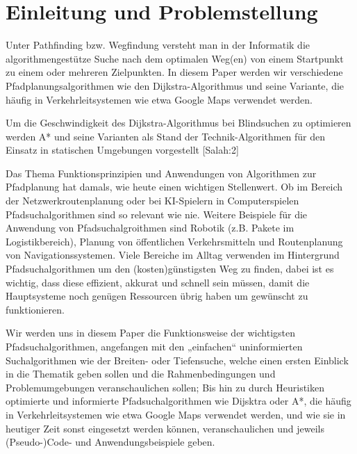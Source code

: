 \chapter{Einleitung und Problemstellung}

Unter Pathfinding bzw. Wegfindung versteht man in der Informatik die algorithmengestütze Suche nach dem optimalen Weg(en) von einem Startpunkt zu einem oder mehreren Zielpunkten. 
In diesem Paper werden wir verschiedene Pfadplanungsalgorithmen wie den Dijkstra-Algorithmus und seine Variante, die häufig in Verkehrleitsystemen wie etwa Google Maps verwendet werden.

Um die Geschwindigkeit des Dijkstra-Algorithmus bei Blindsuchen zu optimieren werden A* und seine Varianten als Stand der Technik-Algorithmen für den Einsatz in statischen Umgebungen vorgestellt [Salah:2] 

Das Thema Funktionsprinzipien und Anwendungen von Algorithmen zur Pfadplanung hat damals, wie heute einen wichtigen Stellenwert. 
Ob im Bereich der Netzwerkroutenplanung oder bei KI-Spielern in Computerspielen Pfadsuchalgorithmen sind so relevant wie nie. 
Weitere Beispiele für die Anwendung von Pfadsuchalgroithmen sind Robotik (z.B. Pakete im Logistikbereich), Planung von öffentlichen Verkehrsmitteln und Routenplanung von Navigationssystemen. 
Viele Bereiche im Alltag verwenden im Hintergrund Pfadsuchalgorithmen um den (kosten)günstigsten Weg zu finden, dabei ist es wichtig, dass diese effizient, akkurat und schnell sein müssen, 
damit die Hauptsysteme noch genügen Ressourcen übrig haben um gewünscht zu funktionieren. \cite{Foeada:21}

Wir werden uns in diesem Paper die Funktionsweise der wichtigsten Pfadsuchalgorithmen, angefangen mit den „einfachen“ uninformierten Suchalgorithmen wie der Breiten- oder Tiefensuche, 
welche einen ersten Einblick in die Thematik geben sollen und die Rahmenbedingungen und Problemumgebungen veranschaulichen sollen; 
Bis hin zu durch Heuristiken optimierte und informierte Pfadsuchalgorithmen wie Dijsktra oder A*, die häufig in Verkehrleitsystemen wie etwa Google Maps verwendet werden, und wie sie in heutiger Zeit 
sonst eingesetzt werden können, veranschaulichen und jeweils (Pseudo-)Code- und Anwendungsbeispiele geben.\cite{Russell:10}
